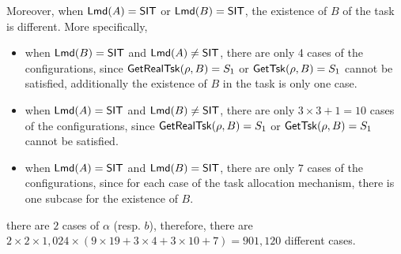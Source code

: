 {\begin{enumerate}
\end{enumerate}
Moreover, when ${\sf Lmd}(A) = {\sf SIT}$ or ${\sf Lmd}(B) = {\sf SIT}$, the existence of $B$ of the task is different. More specifically, 
\begin{itemize}
    \item when ${\sf Lmd}(B) = {\sf SIT}$ and ${\sf Lmd}(A) \neq {\sf SIT}$, there are only 4 cases of the configurations, since $\mathsf{GetRealTsk}(\rho, B) = S_1$ or $\mathsf{GetTsk}(\rho,B) = S_1$ cannot be satisfied, additionally the existence of $B$ in the task is only one case.
    \item when ${\sf Lmd}(A) = {\sf SIT}$ and ${\sf Lmd}(B) \neq {\sf SIT}$, there are only $3\times 3 + 1 = 10$ cases of the configurations, since $\mathsf{GetRealTsk}(\rho, B) = S_1$ or $\mathsf{GetTsk}(\rho,B) = S_1$ cannot be satisfied.
    \item when ${\sf Lmd}(A) = {\sf SIT}$ and ${\sf Lmd}(B) = {\sf SIT}$, there are only $7$ cases of the configurations, since for each case of the task allocation mechanism, there is one subcase for the existence of $B$.
\end{itemize}
there are $2$ cases of $\alpha$ (resp. $b$), therefore, there are 
$2\times 2\times 1,024 \times (9 \times 19 + 3 \times 4 + 3 \times 10 + 7) = 901,120$
 different cases.
}

